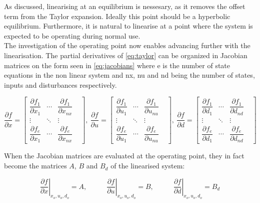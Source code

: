 As discussed, linearising at an equilibrium is nessesary, as it removes the offset term from the Taylor expansion. Ideally this point should be a hyperbolic equilibrium. Furthermore, it is natural to linearise at a point where the system is expected to be operating during normal use. \\

The investigation of the operating point now enables advancing further with the linearisation. The partial derivatives of \cref{eq:taylor} can be organized in Jacobian matrices on the form seen in \cref{eq:jacobians} where e is the number of state equations in the non linear system and nx, nu and nd being the number of states, inputs and disturbances respectively.

\begin{equation} \label{eq:jacobians}
	\dfrac{\partial f}{\partial x} =
	\begin{bmatrix}
		\dfrac{\partial f_1}{\partial x_1} & \cdots & \dfrac{\partial f_1}{\partial x_{nx}} & \\
		\vdots & \ddots & \vdots & \\
		\dfrac{\partial f_e}{\partial x_1} & \cdots & \dfrac{\partial f_e}{\partial x_{nx}} &
	\end{bmatrix}, \
	\dfrac{\partial f}{\partial u} =
	\begin{bmatrix}
		\dfrac{\partial f_1}{\partial u_1} & \cdots & \dfrac{\partial f_1}{\partial u_{nu}} & \\
		\vdots & \ddots & \vdots & \\
		\dfrac{\partial f_e}{\partial u_1} & \cdots & \dfrac{\partial f_e}{\partial u_{nu}} &
	\end{bmatrix}, \
	\dfrac{\partial f}{\partial d} =
	\begin{bmatrix}
		\dfrac{\partial f_1}{\partial d_1} & \cdots & \dfrac{\partial f_1}{\partial d_{nd}} & \\
		\vdots & \ddots & \vdots & \\
		\dfrac{\partial f_e}{\partial d_1} & \cdots & \dfrac{\partial f_e}{\partial d_{nd}} &
	\end{bmatrix}
\end{equation}

When the Jacobian matrices are evaluated at the operating point, they in fact become the matrices $ A $, $ B $ and $ B_d  $ of the linearised system:

\begin{equation}
	\left. \dfrac{\partial f}{\partial x} \right |_{x_o, u_o, d_o} = A, \;\;\;\;\;\;\;\;\;\;
	\left. \dfrac{\partial f}{\partial u} \right |_{x_o, u_o, d_o} = B, \;\;\;\;\;\;\;\;\;\;
	\left. \dfrac{\partial f}{\partial d} \right |_{x_o, u_o, d_o} = B_d
\end{equation}

